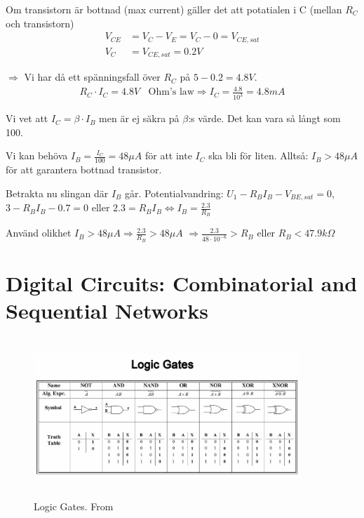 Om transistorn är bottnad (max current) gäller det att potatialen i C (mellan $R_C$
och transistorn)
\begin{align*}
    V_{CE} &= V_C - V_E = V_C - 0 = V_{CE,sat} \\
    V_C &= V_{CE,sat} = 0.2V
\end{align*}

$\Rightarrow$ Vi har då ett spänningsfall över $R_C$ på $5-0.2=4.8V$. \newline
\begin{align*}
    R_C\cdot I_C = 4.8V \;\; \text{ Ohm's law} \Rightarrow I_C = \frac{4.8}{10^3} = 4.8mA
\end{align*}

Vi vet att $I_C=\beta\cdot I_B$ men är ej säkra på $\beta$:s värde. Det kan vara så 
långt som 100. \newline

Vi kan behöva $I_B=\frac{I_C}{100}=48\mu A$ för att inte $I_C$ ska bli för liten.
Alltså: $I_B>48\mu A$ för att garantera bottnad transistor. \newline

Betrakta nu slingan där $I_B$ går. \newline
Potentialvandring: $U_1-R_BI_B-V_{BE,sat}= 0$, $3-R_BI_B-0.7=0$ \newline
eller $2.3=R_BI_B \Leftrightarrow I_B=\frac{2.3}{R_B}$ \newline

Använd olikhet $I_B>48\mu A \Rightarrow \frac{2.3}{R_B}>48\mu A$ $\Rightarrow \frac{2.3}{48\cdot10^{-6}}>R_B$ eller $R_B<47.9k\Omega$



\newpage
\section{Digital Circuits: Combinatorial and Sequential Networks}
\begin{figure}[h]
    \vspace{10mm}
    \centering
    \includegraphics[width=10cm, height=6cm]{image/logic-gates.jpeg}
    \caption{Logic Gates. From \cite{}}
\end{figure}

